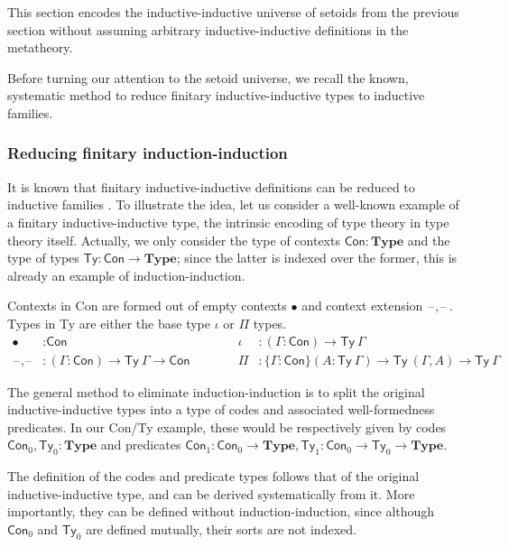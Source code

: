 \documentclass[autoref]{llncs}
\newcommand{\GG}{\Gamma}
\newcommand{\mType}{\mathbf{Type}}
\newcommand{\blank}{\mathord{\hspace{1pt}\text{--}\hspace{1pt}}}
\begin{document}
This section encodes the inductive-inductive universe of setoids from
the previous section without assuming arbitrary inductive-inductive
definitions in the metatheory.

Before turning our attention to the setoid universe, we recall the known,
systematic method to reduce finitary inductive-inductive types to inductive
families.

\subsubsection{Reducing finitary induction-induction}

It is known that finitary inductive-inductive definitions can be reduced to
inductive families \cite{iit-erasure,iit-to-ix,induction-is-enough}.
%
To illustrate the idea, let us consider a well-known example of a finitary
inductive-inductive type, the intrinsic encoding of type theory in type theory
itself. Actually, we only consider the type of contexts $\textsf{Con} :
\mType$ and the type of types $\textsf{Ty} : \textsf{Con} \to \mType$; since the
latter is indexed over the former, this is already an example of
induction-induction.

Contexts in \textsf{Con} are formed out of empty contexts $\bullet$ and context
extension $\blank,\blank$. Types in \textsf{Ty} are either the base type $\iota$ or
$\Pi$ types.
{\small\vspace{-0.2em}
\begin{align*}
  \bullet &: \textsf{Con}                                                                  &  \iota &: (\GG : \textsf{Con}) \to \textsf{Ty}\ \GG \\
  \blank,\blank &: (\GG : \textsf{Con}) \to \textsf{Ty}\ \GG \to \textsf{Con} \hspace{3em} &  \Pi &: \{\GG : \textsf{Con}\} (A : \textsf{Ty}\ \GG) \to \textsf{Ty}\ (\GG , A) \to \textsf{Ty}\ \GG
\end{align*}}\vspace{-1em}

The general method to eliminate induction-induction is to split the original
inductive-inductive types into a type of codes and associated well-formedness
predicates. In our \textsf{Con/Ty} example, these would be respectively given by
codes $\textsf{Con}_0, \textsf{Ty}_0 : \mType$ and predicates $\textsf{Con}_1 :
\textsf{Con}_0 \to \mType, \textsf{Ty}_1 : \textsf{Con}_0 \to \textsf{Ty}_0 \to
\mType$.

The definition of the codes and predicate types follows that of the original
inductive-inductive type, and can be derived systematically from it. More
importantly, they can be defined without induction-induction, since although
$\textsf{Con}_0$ and $\textsf{Ty}_0$ are defined mutually, their sorts are not
indexed. \\
\end{document}
